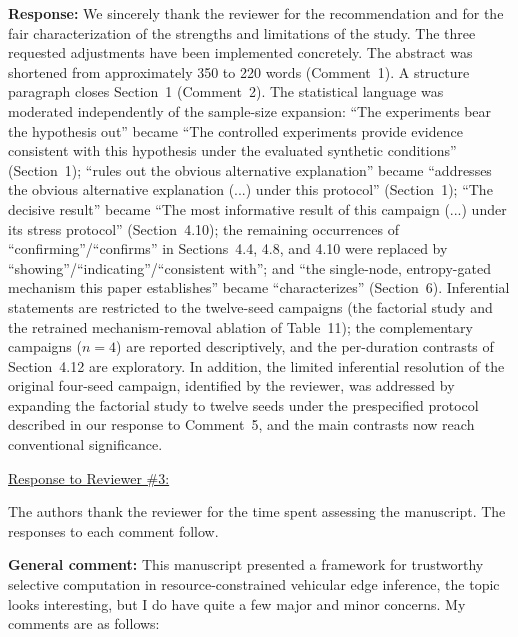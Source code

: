 \documentclass[1p,12pt,authoryear]{elsarticle}
\begin{document}
\vspace{2mm}
\noindent \textbf{Response:} We sincerely thank the reviewer for the recommendation and for the fair characterization of the strengths and limitations of the study. The three requested adjustments have been implemented concretely. The abstract was shortened from approximately 350 to 220 words (Comment~1). A structure paragraph closes Section~1 (Comment~2). The statistical language was moderated independently of the sample-size expansion: ``The experiments bear the hypothesis out'' became ``The controlled experiments provide evidence consistent with this hypothesis under the evaluated synthetic conditions'' (Section~1); ``rules out the obvious alternative explanation'' became ``addresses the obvious alternative explanation (...) under this protocol'' (Section~1); ``The decisive result'' became ``The most informative result of this campaign (...) under its stress protocol'' (Section~4.10); the remaining occurrences of ``confirming''/``confirms'' in Sections~4.4, 4.8, and 4.10 were replaced by ``showing''/``indicating''/``consistent with''; and ``the single-node, entropy-gated mechanism this paper establishes'' became ``characterizes'' (Section~6). Inferential statements are restricted to the twelve-seed campaigns (the factorial study and the retrained mechanism-removal ablation of Table~11); the complementary campaigns ($n=4$) are reported descriptively, and the per-duration contrasts of Section~4.12 are exploratory. In addition, the limited inferential resolution of the original four-seed campaign, identified by the reviewer, was addressed by expanding the factorial study to twelve seeds under the prespecified protocol described in our response to Comment~5, and the main contrasts now reach conventional significance.
\newpage


\begin{large}
\noindent \underline{Response to Reviewer \#3:}
\end{large}

\vspace{10pt}

\noindent The authors thank the reviewer for the time spent assessing the manuscript. The responses to each comment follow.

\vspace{2mm}
\noindent \textbf{General comment:} This manuscript presented a framework for trustworthy selective computation in resource-constrained vehicular edge inference, the topic looks interesting, but I do have quite a few major and minor concerns. My comments are as follows:
\end{document}
